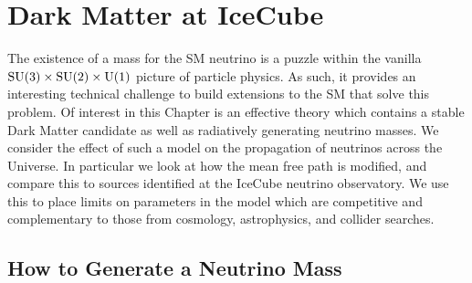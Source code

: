 \chapter{Dark Matter at IceCube}\label{chap:neutrinos}

The existence of a mass for the SM neutrino is a puzzle within the vanilla $\rm{SU}(3) \times \rm{SU}(2) \times \rm{U}(1)$ picture of particle physics. As such, it provides an interesting technical challenge to build extensions to the SM that solve this problem. Of interest in this Chapter is an effective theory which contains a stable Dark Matter candidate as well as radiatively generating neutrino masses. We consider the effect of such a model on the propagation of neutrinos across the Universe. In particular we look at how the mean free path is modified, and compare this to sources identified at the IceCube neutrino observatory. We use this to place limits on parameters in the model which are competitive and complementary to those from cosmology, astrophysics, and collider searches.

\section{How to Generate a Neutrino Mass}


